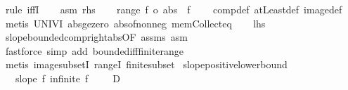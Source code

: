 \begin{isabellebody}
%
\isadelimproof
%
\endisadelimproof
%
\isatagproof
{}\isamarkupfalse%
\ {\isacharparenleft}{\kern0pt}rule\ iffI{\isacharparenright}{\kern0pt}\isanewline
\ \ \isamarkupfalse%
\ asm{\isacharcolon}{\kern0pt}\ {\isacharquery}{\kern0pt}rhs\isanewline
\ \ \isamarkupfalse%
\ {\isachardoublequoteopen}range\ {\isacharparenleft}{\kern0pt}f\ o\ abs{\isacharparenright}{\kern0pt}\ {\isacharequal}{\kern0pt}\ f\ {\isacharbackquote}{\kern0pt}\ {\isacharbraceleft}{\kern0pt}{}{\isachardot}{\kern0pt}{\isachardot}{\kern0pt}{\isacharbraceright}{\kern0pt}{\isachardoublequoteclose}\ \isamarkupfalse%
\ comp{\isacharunderscore}{\kern0pt}def\ atLeast{\isacharunderscore}{\kern0pt}def\ image{\isacharunderscore}{\kern0pt}def\ \isamarkupfalse%
\ {\isacharparenleft}{\kern0pt}metis\ UNIV{\isacharunderscore}{\kern0pt}I\ abs{\isacharunderscore}{\kern0pt}ge{\isacharunderscore}{\kern0pt}zero\ abs{\isacharunderscore}{\kern0pt}of{\isacharunderscore}{\kern0pt}nonneg\ mem{\isacharunderscore}{\kern0pt}Collect{\isacharunderscore}{\kern0pt}eq{\isacharparenright}{\kern0pt}\isanewline
\ \ \isamarkupfalse%
\ {\isacharquery}{\kern0pt}lhs\ \isamarkupfalse%
\ slope{\isacharunderscore}{\kern0pt}bounded{\isacharunderscore}{\kern0pt}comp{\isacharunderscore}{\kern0pt}right{\isacharunderscore}{\kern0pt}abs{\isacharbrackleft}{\kern0pt}OF\ assms{\isacharbrackright}{\kern0pt}\ asm\ \isamarkupfalse%
\ {\isacharparenleft}{\kern0pt}fastforce\ simp\ add{\isacharcolon}{\kern0pt}\ bounded{\isacharunderscore}{\kern0pt}iff{\isacharunderscore}{\kern0pt}finite{\isacharunderscore}{\kern0pt}range{\isacharparenright}{\kern0pt}\isanewline
{}\isamarkupfalse%
\ {\isacharparenleft}{\kern0pt}metis\ image{\isacharunderscore}{\kern0pt}subsetI\ rangeI\ finite{\isacharunderscore}{\kern0pt}subset{\isacharparenright}{\kern0pt}%
\endisatagproof
{\isafoldproof}%
%
\isadelimproof
\isanewline
%
\endisadelimproof
\isanewline
{}\isamarkupfalse%
\ slope{\isacharunderscore}{\kern0pt}positive{\isacharunderscore}{\kern0pt}lower{\isacharunderscore}{\kern0pt}bound{\isacharcolon}{\kern0pt}\isanewline
\ \ \ {\isachardoublequoteopen}slope\ f{\isachardoublequoteclose}\ {\isachardoublequoteopen}infinite\ {\isacharparenleft}{\kern0pt}f\ {\isacharbackquote}{\kern0pt}\ {\isacharbraceleft}{\kern0pt}{}{\isachardot}{\kern0pt}{\isachardot}{\kern0pt}{\isacharbraceright}{\kern0pt}\ {\isasyminter}\ {\isacharbraceleft}{\kern0pt}{}{\isacharless}{\kern0pt}{\isachardot}{\kern0pt}{\isachardot}{\kern0pt}{\isacharbraceright}{\kern0pt}{\isacharparenright}{\kern0pt}{\isachardoublequoteclose}\ {\isachardoublequoteopen}D\ {\isachargreater}{\kern0pt}\ {}{\isachardoublequoteclose}\isanewline

\end{isabellebody}
